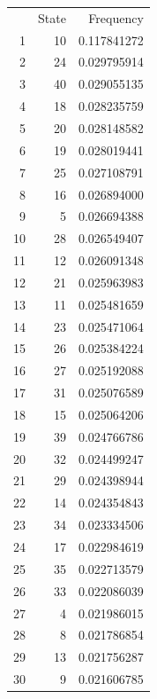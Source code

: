 \documentclass[12pt]{article}
\begin{document}
\begin{table}
    \centering
    \begin{tabular}{rrr}
      & State      & Frequency   \\
        1  & 10         & 0.117841272 \\ 
        2  & 24         & 0.029795914 \\ 
        3  & 40         & 0.029055135 \\ 
        4  & 18         & 0.028235759 \\ 
        5  & 20         & 0.028148582 \\ 
        6  & 19         & 0.028019441 \\ 
        7  & 25         & 0.027108791 \\ 
        8  & 16         & 0.026894000 \\ 
        9  & 5          & 0.026694388 \\ 
        10 & 28         & 0.026549407 \\ 
        11 & 12         & 0.026091348 \\ 
        12 & 21         & 0.025963983 \\ 
        13 & 11         & 0.025481659 \\ 
        14 & 23         & 0.025471064 \\ 
        15 & 26         & 0.025384224 \\ 
        16 & 27         & 0.025192088 \\ 
        17 & 31         & 0.025076589 \\ 
        18 & 15         & 0.025064206 \\ 
        19 & 39         & 0.024766786 \\ 
        20 & 32         & 0.024499247 \\ 
        21 & 29         & 0.024398944 \\ 
        22 & 14         & 0.024354843 \\ 
        23 & 34         & 0.023334506 \\ 
        24 & 17         & 0.022984619 \\ 
        25 & 35         & 0.022713579 \\ 
        26 & 33         & 0.022086039 \\ 
        27 & 4          & 0.021986015 \\ 
        28 & 8          & 0.021786854 \\ 
        29 & 13         & 0.021756287 \\ 
        30 & 9          & 0.021606785 \\ 

\end{tabular}
\end{table}
\end{document}
